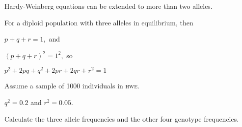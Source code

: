 \documentclass[t]{beamer}
\begin{document}
%

%
%
%
%
%
%
%
%
%
%
%
%



%
%
%
%
%
%


\begin{frame}[t]{Hardy-Weinberg equations can be extended to more than two alleles.}

For a diploid population with three alleles in equilibrium, then

\hangpara $p + q + r = 1,$ and

\hangpara $(p + q + r)^2 = 1^2,$ so

\hangpara $p^2 + 2pq + q^2 + 2pr + 2qr + r^2 = 1$


\end{frame}


\begin{frame}[t]{Assume a sample of 1000 individuals in \textsc{hwe}.}

\hangpara $q^2 = 0.2$ and $r^2 = 0.05.$

\hangpara Calculate the three allele frequencies and the other four genotype frequencies.
\end{frame}


\end{document}

